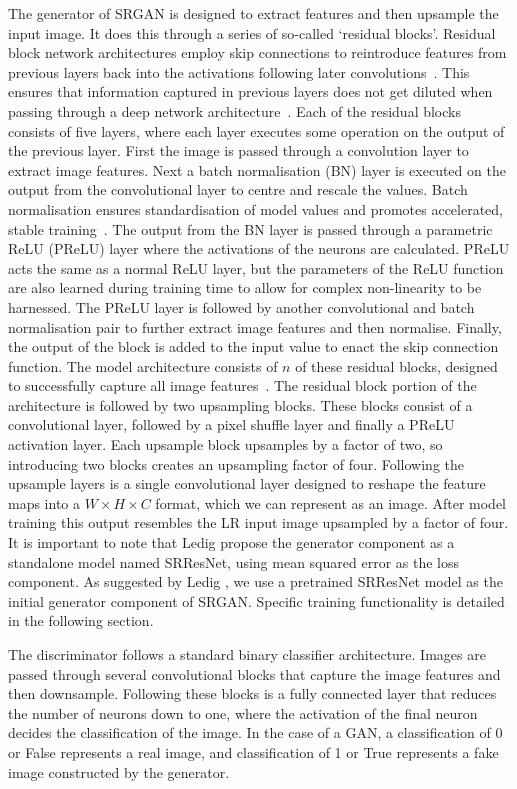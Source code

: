 The generator of SRGAN is designed to extract features and then upsample the input image. It does this through a series of so-called `residual blocks'. Residual block network architectures employ skip connections to reintroduce features from previous layers back into the activations following later convolutions~\cite{ref}. This ensures that information captured in previous layers does not get diluted when passing through a deep network architecture~\cite{ref}. Each of the residual blocks consists of five layers, where each layer executes some operation on the output of the previous layer. First the image is passed through a convolution layer to extract image features. Next a batch normalisation (BN) layer is executed on the output from the convolutional layer to centre and rescale the values. Batch normalisation ensures standardisation of model values and promotes accelerated, stable training~\cite{ref}. The output from the BN layer is passed through a parametric ReLU (PReLU) layer where the activations of the neurons are calculated. PReLU acts the same as a normal ReLU layer, but the parameters of the ReLU function are also learned during training time to allow for complex non-linearity to be harnessed. The PReLU layer is followed by another convolutional and batch normalisation pair to further extract image features and then normalise. Finally, the output of the block is added to the input value to enact the skip connection function. The model architecture consists of $n$ of these residual blocks, designed to successfully capture all image features~\cite{ref}. The residual block portion of the architecture is followed by two upsampling blocks. These blocks consist of a convolutional layer, followed by a pixel shuffle layer and finally a PReLU activation layer. Each upsample block upsamples by a factor of two, so introducing two blocks creates an upsampling factor of four. Following the upsample layers is a single convolutional layer designed to reshape the feature maps into a $W \times H \times C$ format, which we can represent as an image. After model training this output resembles the LR input image upsampled by a factor of four. It is important to note that Ledig \etal propose the generator component as a standalone model named SRResNet, using mean squared error as the loss component. As suggested by Ledig \etal , we use a pretrained SRResNet model as the initial generator component of SRGAN. Specific training functionality is detailed in the following section.

The discriminator follows a standard binary classifier architecture. Images are passed through several convolutional blocks that capture the image features and then downsample. Following these blocks is a fully connected layer that reduces the number of neurons down to one, where the activation of the final neuron decides the classification of the image. In the case of a GAN, a classification of 0 or False represents a real image, and classification of 1 or True represents a fake image constructed by the generator. 

